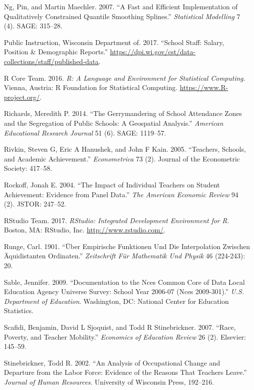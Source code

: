 \documentclass[12pt,]{article}
\begin{document}
\hypertarget{ref-ng}{}
Ng, Pin, and Martin Maechler. 2007. ``A Fast and Efficient
Implementation of Qualitatively Constrained Quantile Smoothing
Splines.'' \emph{Statistical Modelling} 7 (4). SAGE: 315--28.

\hypertarget{ref-dpi}{}
Public Instruction, Wisconsin Department of. 2017. ``School Staff:
Salary, Position \& Demographic Reports.''
\url{https://dpi.wi.gov/cst/data-collections/staff/published-data}.

\hypertarget{ref-r}{}
R Core Team. 2016. \emph{R: A Language and Environment for Statistical
Computing}. Vienna, Austria: R Foundation for Statistical Computing.
\url{https://www.R-project.org/}.

\hypertarget{ref-richards}{}
Richards, Meredith P. 2014. ``The Gerrymandering of School Attendance
Zones and the Segregation of Public Schools: A Geospatial Analysis.''
\emph{American Educational Research Journal} 51 (6). SAGE: 1119--57.

\hypertarget{ref-rivkin}{}
Rivkin, Steven G, Eric A Hanushek, and John F Kain. 2005. ``Teachers,
Schools, and Academic Achievement.'' \emph{Econometrica} 73 (2). Journal
of the Econometric Society: 417--58.

\hypertarget{ref-rockoff}{}
Rockoff, Jonah E. 2004. ``The Impact of Individual Teachers on Student
Achievement: Evidence from Panel Data.'' \emph{The American Economic
Review} 94 (2). JSTOR: 247--52.

\hypertarget{ref-rstudio}{}
RStudio Team. 2017. \emph{RStudio: Integrated Development Environment
for R}. Boston, MA: RStudio, Inc. \url{http://www.rstudio.com/}.

\hypertarget{ref-runge}{}
Runge, Carl. 1901. ``Über Empirische Funktionen Und Die Interpolation
Zwischen Äquidistanten Ordinaten.'' \emph{Zeitschrift Für Mathematik Und
Physik} 46 (224-243): 20.

\hypertarget{ref-sable}{}
Sable, Jennifer. 2009. ``Documentation to the Nces Common Core of Data
Local Education Agency Universe Survey: School Year 2006-07 (Nces
2009-301).'' \emph{U.S. Department of Education}. Washington, DC:
National Center for Education Statistics.

\hypertarget{ref-scafidi}{}
Scafidi, Benjamin, David L Sjoquist, and Todd R Stinebrickner. 2007.
``Race, Poverty, and Teacher Mobility.'' \emph{Economics of Education
Review} 26 (2). Elsevier: 145--59.

\hypertarget{ref-stinebrickner}{}
Stinebrickner, Todd R. 2002. ``An Analysis of Occupational Change and
Departure from the Labor Force: Evidence of the Reasons That Teachers
Leave.'' \emph{Journal of Human Resources}. University of Wisconsin
Press, 192--216.
\end{document}
